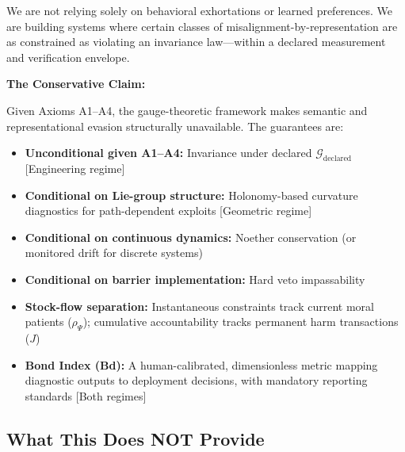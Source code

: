 \documentclass[12pt]{article}
\begin{document}
We are not relying solely on behavioral exhortations or learned preferences. We are building
systems where certain classes of misalignment-by-representation are as constrained as violating an
invariance law---within a declared measurement and verification envelope.

\textbf{The Conservative Claim:}

Given Axioms A1--A4, the gauge-theoretic framework makes semantic and representational
evasion structurally unavailable. The guarantees are:

\begin{itemize}
\item \textbf{Unconditional given A1--A4:} Invariance under declared $\mathcal{G}_{\text{declared}}$ [Engineering regime]
\item \textbf{Conditional on Lie-group structure:} Holonomy-based curvature diagnostics for path-dependent exploits [Geometric regime]
\item \textbf{Conditional on continuous dynamics:} Noether conservation (or monitored drift for discrete systems)
\item \textbf{Conditional on barrier implementation:} Hard veto impassability
\item \textbf{Stock-flow separation:} Instantaneous constraints track current moral patients ($\rho_\Psi$); cumulative accountability tracks permanent harm transactions ($J$)
\item \textbf{Bond Index (Bd):} A human-calibrated, dimensionless metric mapping diagnostic outputs
to deployment decisions, with mandatory reporting standards [Both regimes]
\end{itemize}

\subsection{What This Does NOT Provide}
\end{document}
